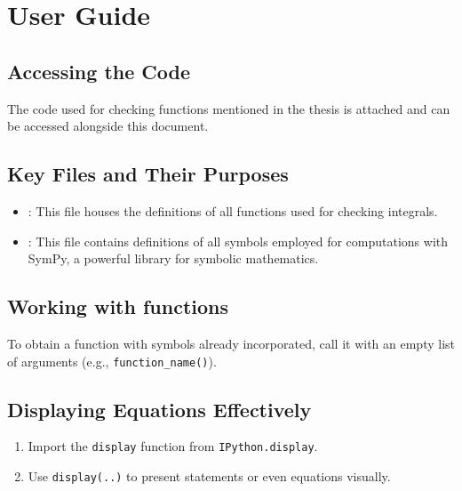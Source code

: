 \section{User Guide}\label{sec:userguide}

\subsection{Accessing the Code}\label{subsec:accessing_code}

The code used for checking functions mentioned in the thesis is attached and can be accessed alongside this document.

\subsection{Key Files and Their Purposes}\label{subsec:key_files}

\begin{itemize}
    \item {}:
    This file houses the definitions of all functions used for checking integrals.
    \item {}:
    This file contains definitions of all symbols employed for computations with SymPy, a powerful library for symbolic mathematics.
\end{itemize}

\subsection{Working with functions}\label{subsec:working_with_funcs}

To obtain a function with symbols already incorporated, call it with an empty list of arguments (e.g., \texttt{function_name()}).

\subsection{Displaying Equations Effectively}\label{subsec:displaying_eqs}

\begin{enumerate}
    \item Import the \texttt{display} function from \texttt{IPython.display}.
    \item Use \texttt{display(..)} to present statements or even equations visually.
\end{enumerate}

